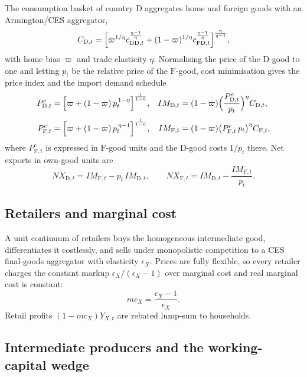 \documentclass[11pt]{article}
\numberwithin{equation}{section}
\newcommand{\D}{\mathrm{D}}
\newcommand{\F}{\mathrm{F}}
\theoremstyle{definition}
\theoremstyle{plain}
\theoremstyle{remark}
\begin{document}
The consumption basket of country $\D$ aggregates home and foreign goods with an
Armington/CES aggregator,
\begin{equation}
C_{\D,t}=\Bigl[\varpi^{1/\eta}c_{\D\D,t}^{\frac{\eta-1}{\eta}}
+(1-\varpi)^{1/\eta}c_{\F\D,t}^{\frac{\eta-1}{\eta}}\Bigr]^{\frac{\eta}{\eta-1}},
\label{eq:ces-aggregator}
\end{equation}
with home bias $\varpi$ and trade elasticity $\eta$. Normalising the price of the
$\D$-good to one and letting $p_t$ be the relative price of the $\F$-good, cost
minimisation gives the price index and the import demand schedule
\begin{align}
P^{c}_{\D,t}&=\Bigl[\varpi+(1-\varpi)\,p_t^{\,1-\eta}\Bigr]^{\frac{1}{1-\eta}},
&
IM_{\D,t}&=(1-\varpi)\Bigl(\frac{P^{c}_{\D,t}}{p_t}\Bigr)^{\eta}C_{\D,t},
\label{eq:ces-D}\\[3pt]
P^{c}_{\F,t}&=\Bigl[\varpi+(1-\varpi)\,p_t^{\,\eta-1}\Bigr]^{\frac{1}{1-\eta}},
&
IM_{\F,t}&=(1-\varpi)\bigl(P^{c}_{\F,t}\,p_t\bigr)^{\eta}C_{\F,t},
\label{eq:ces-F}
\end{align}
where $P^{c}_{\F,t}$ is expressed in $\F$-good units and the $\D$-good costs $1/p_t$
there. Net exports in own-good units are
\begin{equation}
NX_{\D,t}=IM_{\F,t}-p_t\,IM_{\D,t},
\qquad
NX_{\F,t}=IM_{\D,t}-\frac{IM_{\F,t}}{p_t}.
\label{eq:nx}
\end{equation}

\subsection{Retailers and marginal cost}

A unit continuum of retailers buys the homogeneous intermediate good, differentiates
it costlessly, and sells under monopolistic competition to a CES final-goods
aggregator with elasticity $\epsilon_X$. Prices are fully flexible, so every retailer
charges the constant markup $\epsilon_X/(\epsilon_X-1)$ over marginal cost and real
marginal cost is constant:
\begin{equation}
mc_X=\frac{\epsilon_X-1}{\epsilon_X}.
\label{eq:mc}
\end{equation}
Retail profits $(1-mc_X)Y_{X,t}$ are rebated lump-sum to households.

\subsection{Intermediate producers and the working-capital wedge}
\label{sec:wc}
\end{document}
